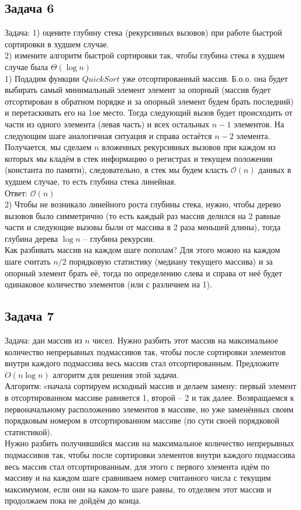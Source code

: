 \documentclass[a4paper,12pt]{article} %
\begin{document}
\subsection*{Задача 6}
Задача: 1) оцените глубину стека (рекурсивных вызовов) при работе быстрой сортировки в худшем случае.\\
2) измените алгоритм быстрой сортировки так, чтобы глубина стека в худшем случае была $\Theta(\log n)$\\

1) Подадим функции $ QuickSort $ уже отсортированный массив. Б.о.о. она будет выбирать самый минимальный элемент элемент за опорный (массив будет отсортирован в обратном порядке и за опорный элемент будем брать последний) и перетаскивать его на 1ое место. Тогда следующий вызов будет происходить от части из одного элемента (левая часть) и всех остальных $ n - 1 $ элементов. На следующим шаге аналогичная ситуация и справа остаётся $ n - 2 $ элемента. Получается, мы сделаем $ n $ вложенных рекурсивных вызовов при каждом из которых мы кладём в стек информацию о регистрах и текущем положении (константа по памяти), следовательно, в стек мы будем класть $ \mathcal{O}(n) $ данных в худшем случае, то есть глубина стека линейная.\\
Ответ: $ \mathcal{O}(n) $\\

2) Чтобы не возникало линейного роста глубины стека, нужно, чтобы дерево вызовов было симметрично (то есть каждый раз массив делился на 2 равные части и следующие вызовы были от массива в 2 раза меньшей длины), тогда глубина дерева $ \log n $ -- глубина рекурсии.\\
Как разбивать массив на каждом шаге пополам? Для этого можно на каждом шаге считать $ n/2 $ порядковую статистику (медиану текущего массива) и за опорный элемент брать её, тогда по определению слева и справа от неё будет одинаковое количество элементов (или с различием на 1). 

\subsection*{Задача 7}
Задача: дан массив из $n$ чисел. Нужно разбить этот массив на максимальное количество непрерывных подмассивов так, чтобы после сортировки элементов внутри каждого подмассива весь массив стал отсортированным. Предложите $O(n\log n)$ алгоритм для решения этой задачи.\\

Алгоритм: cначала сортируем исходный массив и делаем замену: первый элемент в отсортированном массиве равняется 1, второй -- 2 и так далее. Возвращаемся к первоначальному расположению элементов в массиве, но уже заменённых своим порядковым номером в отсортированном массиве (по сути своей порядковой статистикой).\\
Нужно разбить получившийся массив на максимальное количество непрерывных подмассивов так, чтобы после сортировки элементов внутри каждого подмассива весь массив стал отсортированным, для этого с первого элемента идём по массиву и на каждом шаге сравниваем номер считанного числа с текущим максимумом, если они на каком-то шаге равны, то отделяем этот массив и продолжаем пока не дойдём до конца.\\
\end{document}
